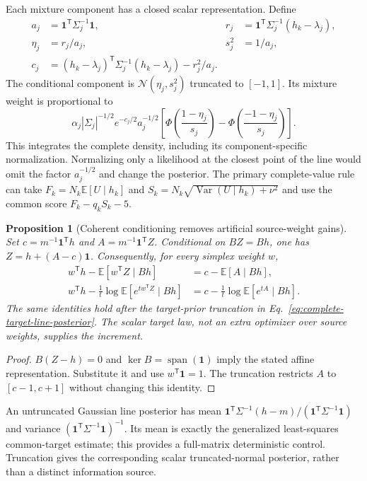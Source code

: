 \documentclass[10pt]{article}
\newtheorem{proposition}{Proposition}
\begin{document}
Each mixture component has a closed scalar representation.  Define
\begin{align}
 a_j&=\mathbf1^{\mathsf T}\Sigma_j^{-1}\mathbf1,
 & r_j&=\mathbf1^{\mathsf T}\Sigma_j^{-1}(h_k-\lambda_j),\nonumber\\
 \eta_j&=r_j/a_j,
 & s_j^2&=1/a_j,\nonumber\\
 c_j&=(h_k-\lambda_j)^{\mathsf T}\Sigma_j^{-1}(h_k-\lambda_j)-r_j^2/a_j.
 \label{eq:conditional-gaussian-line-components}
\end{align}
The conditional component is $\mathcal N(\eta_j,s_j^2)$ truncated to
$[-1,1]$.  Its mixture weight is proportional to
\begin{equation}
 \alpha_j|\Sigma_j|^{-1/2}e^{-c_j/2}a_j^{-1/2}
 \left[\Phi\left(\frac{1-\eta_j}{s_j}\right)
       -\Phi\left(\frac{-1-\eta_j}{s_j}\right)\right].
 \label{eq:conditional-gaussian-line-weights}
\end{equation}
This integrates the complete density, including its component-specific
normalization.  Normalizing only a likelihood at the closest point of
the line would omit the factor $a_j^{-1/2}$ and change the posterior.
The primary complete-value rule can take
$F_k=N_k\mathbb E[U\mid h_k]$ and
$S_k=N_k\sqrt{\operatorname{Var}(U\mid h_k)+\nu^2}$ and use the common score
$F_k-q_kS_k-5$.

\begin{proposition}[Coherent conditioning removes artificial source-weight gains]
\label{prop:conditional-simplex-invariance}
Set $c=m^{-1}\mathbf1^{\mathsf T}h$ and
$A=m^{-1}\mathbf1^{\mathsf T}Z$.  Conditional on $BZ=Bh$, one has
$Z=h+(A-c)\mathbf1$.  Consequently, for every simplex weight $w$,
\begin{align}
 w^{\mathsf T}h-\mathbb E[w^{\mathsf T}Z\mid Bh]&=
 c-\mathbb E[A\mid Bh],\nonumber\\
 w^{\mathsf T}h-\frac1t\log\mathbb E[e^{t w^{\mathsf T}Z}\mid Bh]
 &=c-\frac1t\log\mathbb E[e^{tA}\mid Bh].
 \label{eq:conditional-simplex-invariance}
\end{align}
The same identities hold after the target-prior truncation in
Eq.~\eqref{eq:complete-target-line-posterior}.  The scalar target law,
not an extra optimizer over source weights, supplies the increment.
\end{proposition}
\begin{proof}
$B(Z-h)=0$ and $\ker B=\operatorname{span}(\mathbf1)$ imply the stated
affine representation.  Substitute it and use $w^{\mathsf T}\mathbf1=1$.
The truncation restricts $A$ to $[c-1,c+1]$ without changing this identity.
\end{proof}
An untruncated Gaussian line posterior has mean
$\mathbf1^{\mathsf T}\Sigma^{-1}(h-m)/
(\mathbf1^{\mathsf T}\Sigma^{-1}\mathbf1)$ and variance
$(\mathbf1^{\mathsf T}\Sigma^{-1}\mathbf1)^{-1}$.
Its mean is exactly the generalized least-squares common-target estimate;
this provides a full-matrix deterministic control.  Truncation gives the
corresponding scalar truncated-normal posterior, rather than a distinct
information source.
\end{document}

